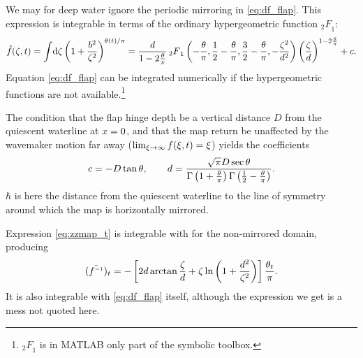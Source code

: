We may for deep water ignore the periodic mirroring in \eqref{eq:df_flap}.
This expression is integrable in terms of the  ordinary hypergeometric function ${_2F}_1$:
\begin{equation}
\tilde{f}(\zeta,t) = \int\!\mathrm d\zeta\left(1+\frac{b^2}{\zeta^2}\right)^{\theta(t)/\pi}=\frac{d}{1-2\frac\theta\pi}\,{_2F}_1\left(-\frac{\theta}{\pi},\frac12-\frac{\theta}{\pi},\frac32-\frac{\theta}{\pi},-\frac{\zeta^2}{d^2}\right)\left(\frac{\zeta}{d}\right)^{1-2\frac\theta\pi} + c.
\label{eq:f_flap}
\end{equation}
Equation \ref{eq:df_flap} can be integrated numerically if the hypergeometric functions are not available.\footnote{${_2F}_1$ is in MATLAB only part of the symbolic toolbox.}

The condition that the flap hinge depth be a vertical distance $D$ from the quiescent waterline at $x=0$, and that the map return be unaffected by the wavemaker motion far away ($\lim_{\xi\to\infty}f(\xi,t) = \xi$) yields the coefficients
\begin{align*}
c = -D\tan\theta,\qquad
d =  \frac{\sqrt\pi D\sec\theta}{\Gamma\left(1+\frac\theta\pi\right)\Gamma\left(\frac12-\frac\theta\pi\right)}.
\end{align*} 
$\hbar$ is here the distance from the quiescent waterline to the line of symmetry around which the map is horizontally mirrored.

Expression \eqref{eq:zzmap_t} is integrable with for the non-mirrored domain, producing
\begin{equation*}
(\tilde\zzmap)_t = -\sbr{2d\arctan\frac\zz d + \zz \ln\rbr{1+\frac{d^2}{\zz^2}}}\frac{\theta_t}{\pi}.
\end{equation*}
It is also integrable with \eqref{eq:df_flap} itself, although the expression we get is a mess not quoted here. 


%